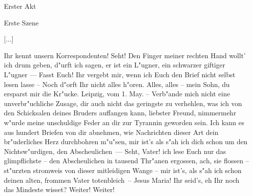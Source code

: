 
\begin{center}

\Large{Erster Akt}

\large{Erste Szene}

\end{center}


[...]

\begin{drama}

\franspeaks {} Ihr kennt unsern Korrespondenten! Seht! Den Finger meiner rechten Hand wollt' ich drum geben, d"urft ich sagen, er ist ein L"ugner, ein schwarzer giftiger L"ugner --- Fasst Euch! Ihr vergebt mir, wenn ich Euch den Brief nicht selbst lesen lasse -- Noch d"orft Ihr nicht alles h"oren.
\moorspeaks {} Alles, alles -- mein Sohn, du ersparst mir die Kr"ucke.
\franspeaks {} \frqq Leipzig, vom 1. May. -- Verb"ande mich nicht eine unverbr"uchliche Zusage, dir auch nicht das geringste zu verhehlen, was ich von den Schicksalen deines Bruders auffangen kann, liebster Freund, nimmermehr w"urde meine unschuldige Feder an dir zur Tyrannin geworden sein. Ich kann es aus hundert Briefen von dir abnehmen, wie Nachrichten dieser Art dein br"uderliches Herz durchbohren m"u"sen, mir ist's als s"ah ich dich schon um den Nichtsw"urdigen, den Abscheulichen\flqq \ ---  Seht, Vater! ich lese Euch nur das glimpflichste -- \frqq den Abscheulichen in tausend Thr"anen ergossen\flqq , ach, sie flossen -- st"urzten stromweis von dieser mitleidigen Wange -- \frqq mir ist's, als s"ah ich schon deinen alten, frommen Vater totenbleich\flqq \ -- Jesus Maria! Ihr seid's, eh Ihr noch das Mindeste wisset?
\moorspeaks {} Weiter! Weiter!


\end{drama}
